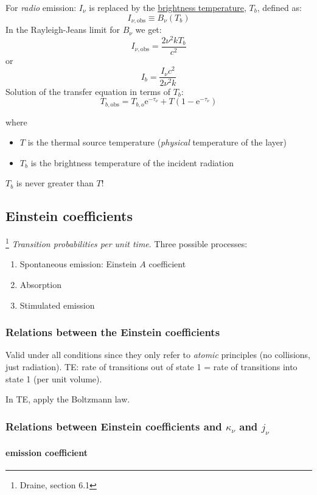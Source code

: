 \documentclass[12pt]{article}
\newcommand{\mar}[1]{\hspace{0pt}\marginpar{-\textcolor{black}{#1}-}}
\begin{document}
For \emph{radio} emission: $I_{\nu}$ is replaced by the \underline{brightness temperature},
$T_{b}$, defined as:$${
    I_{\nu,\mathrm{obs}} \equiv B_{\nu}(T_b)
}$$
In the Rayleigh-Jeans limit for $B_{\nu}$ we get:$${
    I_{\nu,\mathrm{obs}} = \frac{2\nu^{2}kT_{b}}{c^{2}}
}$$ or $${
    I_{b} = \frac{I_{\nu}c^{2}}{2\nu^{2}k}
}$$
Solution of the transfer equation in terms of $T_{b}$:$${
    T_{b,\mathrm{obs}} = T_{b,o}\mathrm{e}^{-\tau_{\nu}} + T(1-\mathrm{e}^{-\tau_{\nu}})
}$$

where\mar{28}
\begin{itemize}
    \item $T$ is the thermal source temperature (\emph{physical} temperature of the layer)
    \item $T_{b}$ is the brightness temperature of the incident radiation
\end{itemize}
\textcolor{bred}{$T_{b}$ is never greater than $T$!}

\subsection{Einstein coefficients}\footnote{Draine, section 6.1}
\emph{Transition probabilities per unit time}. Three possible processes:
\begin{enumerate}
    \item Spontaneous emission: Einstein $A$ coefficient
    \item Absorption
    \item Stimulated\mar{29} emission
\end{enumerate}

\subsubsection{Relations between the Einstein coefficients}
Valid under all conditions since they only refer to \emph{atomic} principles
(no collisions, just radiation).
TE: rate of transitions out of state 1 = rate of transitions into state 1
(per unit volume).

In\mar{30} TE, apply the Boltzmann law.

\subsubsection{Relations between Einstein coefficients and $\kappa_{\nu}$ and $j_{\nu}$}
\paragraph{emission coefficient}
\end{document}
